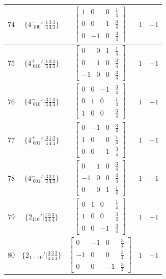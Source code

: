 \documentclass[fleqn,8pt]{jsarticle}
\begin{document}
\begin{longtable}{ccccc}
$ 74 $ & $ \{4^{-}_{\,\,100}{}'|\frac{1}{4} \frac{3}{4} \frac{3}{4}\} $ & $ \begin{bmatrix} 1 & 0 & 0 & \frac{1}{4} \\ 0 & 0 & 1 & \frac{3}{4} \\ 0 & -1 & 0 & \frac{3}{4} \end{bmatrix} $ & $ 1 $ & $ -1 $ \\ \hline
$ 75 $ & $ \{4^{+}_{\,\,010}{}'|\frac{1}{4} \frac{3}{4} \frac{3}{4}\} $ & $ \begin{bmatrix} 0 & 0 & 1 & \frac{1}{4} \\ 0 & 1 & 0 & \frac{3}{4} \\ -1 & 0 & 0 & \frac{3}{4} \end{bmatrix} $ & $ 1 $ & $ -1 $ \\ \hline
$ 76 $ & $ \{4^{-}_{\,\,010}{}'|\frac{3}{4} \frac{1}{4} \frac{3}{4}\} $ & $ \begin{bmatrix} 0 & 0 & -1 & \frac{3}{4} \\ 0 & 1 & 0 & \frac{1}{4} \\ 1 & 0 & 0 & \frac{3}{4} \end{bmatrix} $ & $ 1 $ & $ -1 $ \\ \hline
$ 77 $ & $ \{4^{+}_{\,\,001}{}'|\frac{3}{4} \frac{1}{4} \frac{3}{4}\} $ & $ \begin{bmatrix} 0 & -1 & 0 & \frac{3}{4} \\ 1 & 0 & 0 & \frac{1}{4} \\ 0 & 0 & 1 & \frac{3}{4} \end{bmatrix} $ & $ 1 $ & $ -1 $ \\ \hline
$ 78 $ & $ \{4^{-}_{\,\,001}{}'|\frac{3}{4} \frac{3}{4} \frac{1}{4}\} $ & $ \begin{bmatrix} 0 & 1 & 0 & \frac{3}{4} \\ -1 & 0 & 0 & \frac{3}{4} \\ 0 & 0 & 1 & \frac{1}{4} \end{bmatrix} $ & $ 1 $ & $ -1 $ \\ \hline
$ 79 $ & $ \{2{}_{110}{}'|\frac{1}{4} \frac{3}{4} \frac{3}{4}\} $ & $ \begin{bmatrix} 0 & 1 & 0 & \frac{1}{4} \\ 1 & 0 & 0 & \frac{3}{4} \\ 0 & 0 & -1 & \frac{3}{4} \end{bmatrix} $ & $ 1 $ & $ -1 $ \\ \hline
$ 80 $ & $ \{2{}_{1-10}{}'|\frac{3}{4} \frac{3}{4} \frac{3}{4}\} $ & $ \begin{bmatrix} 0 & -1 & 0 & \frac{3}{4} \\ -1 & 0 & 0 & \frac{3}{4} \\ 0 & 0 & -1 & \frac{3}{4} \end{bmatrix} $ & $ 1 $ & $ -1 $ \\ \hline

\end{longtable}
\end{document}
